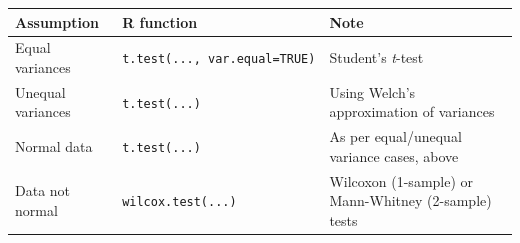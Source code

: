 \documentclass[english,10pt,a4paper,oneside]{book}
\theoremstyle{definition}
\theoremstyle{definition}
\theoremstyle{definition}
\theoremstyle{remark}
\begin{document}
\begin{longtable}[]{@{}lll@{}}
\toprule
\begin{minipage}[b]{0.18\columnwidth}\raggedright\strut
Assumption\strut
\end{minipage} & \begin{minipage}[b]{0.27\columnwidth}\raggedright\strut
R function\strut
\end{minipage} & \begin{minipage}[b]{0.46\columnwidth}\raggedright\strut
Note\strut
\end{minipage}\tabularnewline
\midrule
\endhead
\begin{minipage}[t]{0.18\columnwidth}\raggedright\strut
Equal variances\strut
\end{minipage} & \begin{minipage}[t]{0.27\columnwidth}\raggedright\strut
\texttt{t.test(...,\ var.equal=TRUE)}\strut
\end{minipage} & \begin{minipage}[t]{0.46\columnwidth}\raggedright\strut
Student's \emph{t}-test\strut
\end{minipage}\tabularnewline
\begin{minipage}[t]{0.18\columnwidth}\raggedright\strut
Unequal variances\strut
\end{minipage} & \begin{minipage}[t]{0.27\columnwidth}\raggedright\strut
\texttt{t.test(...)}\strut
\end{minipage} & \begin{minipage}[t]{0.46\columnwidth}\raggedright\strut
Using Welch's approximation of variances\strut
\end{minipage}\tabularnewline
\begin{minipage}[t]{0.18\columnwidth}\raggedright\strut
Normal data\strut
\end{minipage} & \begin{minipage}[t]{0.27\columnwidth}\raggedright\strut
\texttt{t.test(...)}\strut
\end{minipage} & \begin{minipage}[t]{0.46\columnwidth}\raggedright\strut
As per equal/unequal variance cases, above\strut
\end{minipage}\tabularnewline
\begin{minipage}[t]{0.18\columnwidth}\raggedright\strut
Data not normal\strut
\end{minipage} & \begin{minipage}[t]{0.27\columnwidth}\raggedright\strut
\texttt{wilcox.test(...)}\strut
\end{minipage} & \begin{minipage}[t]{0.46\columnwidth}\raggedright\strut
Wilcoxon (1-sample) or Mann-Whitney (2-sample) tests\strut
\end{minipage}\tabularnewline
\bottomrule
\end{longtable}
\end{document}
